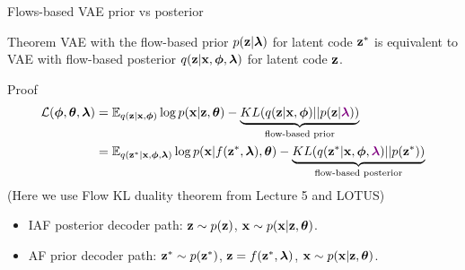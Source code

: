 \begin{frame}{Flows-based VAE prior vs posterior}
	\begin{block}{Theorem}
		VAE with the flow-based prior $p(\mathbf{z} | \boldsymbol{\lambda})$ for latent code $\mathbf{z}^*$ is equivalent to VAE with flow-based posterior $q(\mathbf{z} | \mathbf{x}, \boldsymbol{\phi}, \boldsymbol{\lambda})$ for latent code $\mathbf{z}$.
	\end{block}
	\begin{block}{Proof}
		\vspace{-0.5cm}
		\begin{align*}
			\mathcal{L}(\boldsymbol{\phi}, \boldsymbol{\theta}, \boldsymbol{\lambda}) &= \mathbb{E}_{q(\mathbf{z} | \mathbf{x}, \boldsymbol{\phi})} \log p(\mathbf{x} | \mathbf{z}, \boldsymbol{\theta}) - \underbrace{KL( q(\mathbf{z} | \mathbf{x}, \boldsymbol{\phi}) || p(\mathbf{z} | {\color{violet}\boldsymbol{\lambda}}))}_{\text{flow-based prior}} \\
			& = \mathbb{E}_{q(\mathbf{z}^* | \mathbf{x}, \boldsymbol{\phi}, \boldsymbol{\lambda})} \log p(\mathbf{x} | f(\mathbf{z}^*, \boldsymbol{\lambda}), \boldsymbol{\theta}) - \underbrace{KL( q(\mathbf{z}^* | \mathbf{x}, \boldsymbol{\phi}, {\color{violet}\boldsymbol{\lambda}}) || p(\mathbf{z}^*))}_{\text{flow-based posterior}}
		\end{align*}
		(Here we use Flow KL duality theorem from Lecture 5 and LOTUS)
	\end{block}
	\begin{itemize}
		\item IAF posterior decoder path: $\mathbf{z} \sim p(\mathbf{z})$, $\mathbf{x} \sim p(\mathbf{x}|\mathbf{z}, \boldsymbol{\theta})$.
		\item AF prior decoder path: $\mathbf{z}^* \sim p(\mathbf{z}^*)$, $\mathbf{z} = f(\mathbf{z}^*, \boldsymbol{\lambda})$, $\mathbf{x} \sim p(\mathbf{x}|\mathbf{z}, \boldsymbol{\theta})$. 
	\end{itemize}
\end{frame}

